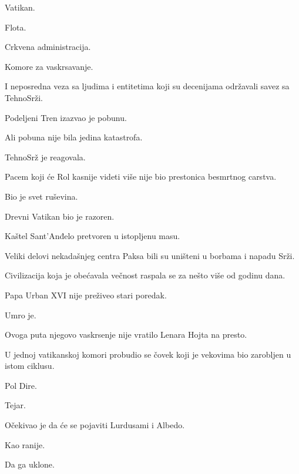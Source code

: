 Vatikan.

Flota.

Crkvena administracija.

Komore za vaskrsavanje.

\bigskip

I neposredna veza sa ljudima i entitetima koji su decenijama održavali savez sa TehnoSrži.

\bigskip

Podeljeni Tren izazvao je pobunu.

\bigskip

Ali pobuna nije bila jedina katastrofa.

\bigskip

TehnoSrž je reagovala.

\bigskip

Pacem koji će Rol kasnije videti više nije bio prestonica besmrtnog carstva.

\bigskip

Bio je svet ruševina.

\bigskip

Drevni Vatikan bio je razoren.

Kaštel Sant'Anđelo pretvoren u istopljenu masu.

Veliki delovi nekadašnjeg centra Paksa bili su uništeni u borbama i napadu Srži.

\bigskip

Civilizacija koja je obećavala večnost raspala se za nešto više od godinu dana.

\bigskip

Papa Urban XVI nije preživeo stari poredak.

\bigskip

Umro je.

\bigskip

Ovoga puta njegovo vaskrsenje nije vratilo Lenara Hojta na presto.

\bigskip

U jednoj vatikanskoj komori probudio se čovek koji je vekovima bio zarobljen u istom ciklusu.

\bigskip

Pol Dire.

\bigskip

Tejar.

\bigskip

Očekivao je da će se pojaviti Lurdusami i Albedo.

\bigskip

Kao ranije.

Da ga uklone.


